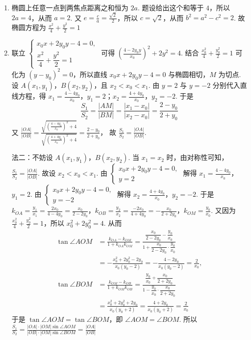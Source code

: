 \begin{solution}
\begin{enumerate}
\item 椭圆上任意一点到两焦点距离之和恒为 \(2a\). 题设给出这个和等于 \(4\)，所以 \(2a=4\)，从而 \(a=2\). 又 \(e=\frac{c}{a}=\frac{\sqrt{2}}{2}\)，所以 \(c=\sqrt{2}\)，从而 \(b^2=a^2-c^2=2\). 故椭圆方程为
\(
\frac{x^2}{4}+\frac{y^2}{2}=1
\)

\item 联立 \(\begin{cases}
x_0x+2y_0y-4=0,\\[0.5ex]
\dfrac{x^2}{4}+\dfrac{y^2}{2}=1
\end{cases}\) 可得
\(\left(\frac{4-2y_0y}{x_0}\right)^2+2y^2=4\).
结合 \( \frac{x_0^2}{4}+\frac{y_0^2}{2}=1 \) 可化为 \( (y-y_0)^2=0 \)，所以直线 \(x_0x+2y_0y-4=0\) 与椭圆相切，\(M\) 为切点. 设 \(A(x_1,y_1)\)，\(B(x_2,y_2)\)，且 \(x_2<x_0<x_1\). 由 \(y=2\) 与 \(y=-2\) 分别代入直线方程，得 \(x_1=\frac{4-4y_0}{x_0}\)，\(y_1=2\)；\(x_2=\frac{4+4y_0}{x_0}\)，\(y_2=-2\). 于是
\[
\frac{S_1}{S_2}=\frac{|AM|}{|BM|}=\frac{|x_1-x_0|}{|x_2-x_0|}=\frac{2-y_0}{2+y_0}
\]
又
\(
\frac{|OA|}{|OB|}=\frac{\sqrt{\left(\frac{4-4y_0}{x_0}\right)^2+4}}{\sqrt{\left(\frac{4+4y_0}{x_0}\right)^2+4}}=\frac{2-y_0}{2+y_0}
\)，
故 \(\frac{S_1}{S_2}=\frac{|OA|}{|OB|}\).

法二：不妨设 \(A(x_1,y_1)\)，\(B(x_2,y_2)\). 当 \(x_1=x_2\) 时，由对称性可知，\(\frac{S_1}{S_2}=\frac{|OA|}{|OB|}\). 故设 \(x_2<x_0<x_1\). 由 \(\begin{cases}
x_0x+2y_0y-4=0,\\
y=2
\end{cases}\) 解得
\(x_1=\frac{4-4y_0}{x_0}\)，\(y_1=2\).
由 \(\begin{cases}
x_0x+2y_0y-4=0,\\
y=-2
\end{cases}\) 解得
\(x_2=\frac{4+4y_0}{x_0}\)，\(y_2=-2\). 于是 \(k_{OA}=\frac{y_1}{x_1}=\frac{2x_0}{4-4y_0}=\frac{x_0}{2-2y_0}\)，\(k_{OB}=\frac{y_2}{x_2}=\frac{-2x_0}{4+4y_0}=-\frac{x_0}{2+2y_0}\)，\(k_{OM}=\frac{y_0}{x_0}\).
又因为
\(\frac{x_0^2}{4}+\frac{y_0^2}{2}=1\)，所以 \(x_0^2+2y_0^2=4\). 从而
\begin{align*}
\tan\angle AOM&=\frac{k_{OA}-k_{OM}}{1+k_{OA}k_{OM}}
=\frac{\dfrac{x_0}{2-2y_0}-\dfrac{y_0}{x_0}}{1+\dfrac{x_0}{2-2y_0}\cdot\dfrac{y_0}{x_0}} \\
&=-\frac{x_0^2+2y_0^2-2y_0}{x_0(y_0-2)}=-\frac{4-2y_0}{x_0(y_0-2)}=\frac{2}{x_0}, \\
\tan\angle BOM&=\frac{k_{OM}-k_{OB}}{1+k_{OM}k_{OB}}
=\frac{\dfrac{y_0}{x_0}+\dfrac{x_0}{2+2y_0}}{1-\dfrac{y_0}{x_0}\cdot\dfrac{x_0}{2+2y_0}} \\
&=\frac{x_0^2+2y_0^2+2y_0}{x_0(y_0+2)}=\frac{4+2y_0}{x_0(y_0+2)}=\frac{2}{x_0}
\end{align*}
于是 \(\tan\angle AOM=\tan\angle BOM\)，即 \(\angle AOM=\angle BOM\). 所以
\(
\frac{S_1}{S_2}=\frac{|OA|\cdot |OM|\sin\angle AOM}{|OB|\cdot |OM|\sin\angle BOM}=\frac{|OA|}{|OB|}
\)
\end{enumerate}
\end{solution}

